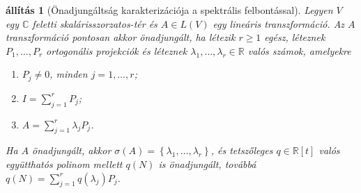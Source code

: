 \documentclass[9pt, a4paper, showtrims]{memoir}
\theoremstyle{plain}
\newtheorem{proposition}{állítás}[chapter]
\theoremstyle{remark}
\theoremstyle{definition}
\begin{document}
\begin{proposition}[Önadjungáltság karakterizációja a spektrális felbontással]
    Legyen $V$ egy $\mathbb{C}$ feletti ska\-lá\-ris\-szor\-za\-tos-tér és $A\in L\left( V \right)$ egy lineáris transzformáció.
    Az $A$ transzformáció pontosan akkor önadjungált,
    ha létezik $r\geq 1$ egész, léteznek $P_1,\dots,P_r$ ortogonális projekciók és
    léteznek $\lambda_1,\dots,\lambda_r\in\mathbb{R}$ valós számok,
    amelyekre
    \begin{enumerate}
        \item $P_j\neq 0$, minden $j=1,\dots,r$;
        \item $I=\sum_{j=1}^rP_j$;
        \item $A=\sum_{j=1}^r\lambda_jP_j$.
    \end{enumerate}
    Ha $A$ önadjungált, 
    akkor $\sigma\left( A \right)=\left\{ \lambda_1,\dots,\lambda_r \right\}$,
    és tetszőleges $q\in\mathbb{R}[t]$ valós együtthatós polinom mellett
    $q\left( N \right)$ is önadjungált, 
    továbbá
    $q\left( N \right)=\sum_{j=1}^rq\left( \lambda_j \right)P_j$.
\end{proposition}
\end{document}
